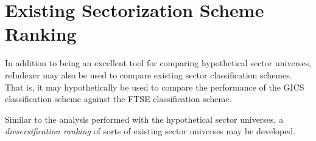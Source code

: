 \documentclass[../main.tex]{subfiles}
\begin{document}
\section{Existing Sectorization Scheme Ranking}

In addition to being an excellent tool for comparing hypothetical sector universes, reIndexer may also be used to compare existing sector classification schemes. That is, it may hypothetically be used to compare the performance of the GICS classification scheme against the FTSE classification scheme.

Similar to the analysis performed with the hypothetical sector universes, a \textit{divsersification ranking} of sorts of existing sector universes may be developed.
\end{document}
